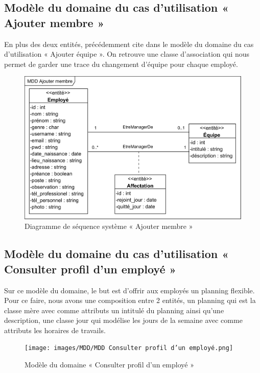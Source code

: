 \begin{itemize}
        \subsection*{Modèle du domaine du cas d'utilisation « Ajouter membre »}
        En plus des deux entités, précédemment cite dans le modèle du domaine du cas d’utilisation « Ajouter équipe ». On retrouve une classe d’association qui nous permet de garder une trace du changement d’équipe pour chaque employé.
        \clearpage
            \begin{figure}[h!]
                 \centering
                \includegraphics[scale=1.22]{images/MDD/MDD Ajouter membre.png}
                 \caption{Diagramme de séquence système « Ajouter membre »}
                 \label{fig17}
            \end{figure}


        \subsection*{Modèle du domaine du cas d'utilisation « Consulter profil d'un employé »}
        Sur ce modèle du domaine, le but est d’offrir aux employés un planning flexible. Pour ce faire, nous avons une composition entre 2 entités, un planning qui est la classe mère avec comme attributs un intitulé du planning ainsi qu’une description, une classe jour qui modélise les jours de la semaine avec comme attributs les horaires de travails.
        \clearpage
            \begin{figure}[h!]
                 \centering
                \texttt{[image: images/MDD/MDD Consulter profil d'un employé.png]}
                 \caption{Modèle du domaine « Consulter profil d'un employé »}
                 \label{fig18}
            \end{figure}
            

\end{itemize}

